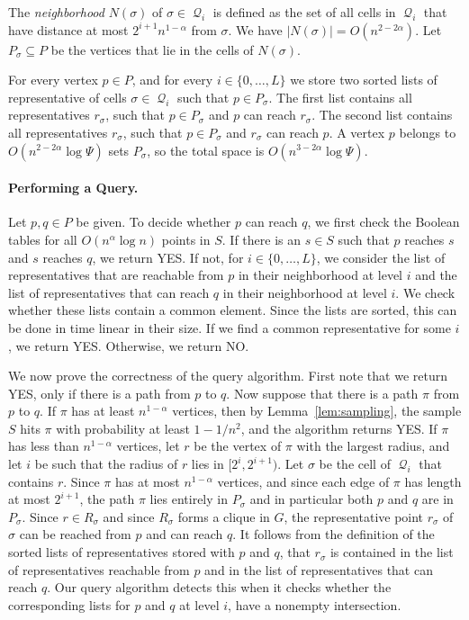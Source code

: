 \documentclass[11pt,a4paper]{paper}
\DeclareMathOperator{\Q}{\mathcal{Q}}
\begin{document}
The \emph{neighborhood} $N(\sigma)$ of $\sigma\in \Q_i$ is defined
as the set of all cells in $\Q_i$ that have distance at most
$2^{i+1}n^{1-\alpha}$ from $\sigma$. We have
$|N(\sigma)| = O(n^{2-2\alpha})$.
Let $P_\sigma \subseteq P$ be the vertices
that lie in the cells of $N(\sigma)$.

For every vertex $p \in P$, and
for every $i \in \{0, \dots, L\}$ we store two sorted lists of representative of cells
$\sigma \in \Q_i$ such that $p \in P_\sigma$. The first list
contains all  representatives $r_\sigma$, such that  $p \in P_\sigma$ and $p$ can reach  $r_\sigma$.
The second list contains all
 representatives $r_\sigma$,  such that  $p \in P_\sigma$ and  $r_\sigma$  can reach $p$.
A vertex $p$ belongs to $O(n^{2-2\alpha}\log \Psi)$
sets $P_\sigma$, so the total space is
$O(n^{3-2\alpha}\log \Psi)$.

\paragraph*{Performing a Query.}
Let $p, q \in P$ be given. To decide whether $p$ can reach $q$,
we first check the Boolean tables for all $O(n^{\alpha}\log n)$ points
in $S$. If there
is an $s\in S$ such that $p$ reaches
$s$ and $s$ reaches $q$, we return YES. If not,
for $i \in \{0, \dots, L\}$,
we consider the list of representatives
that are reachable from $p$ in their neighborhood at level $i$ and
the list of representatives that can reach $q$ in their
neighborhood at level $i$. We check
whether these lists contain a common element. Since the lists are
sorted, this can be done in time linear in their size.
If we find a common representative for some $i$, we return YES.
Otherwise, we return NO.

We now prove the correctness of the query algorithm. First note that we
return YES, only if there is a path from $p$ to
$q$.  Now suppose that there is a path $\pi$ from $p$ to $q$.
If $\pi$ has at least $n^{1-\alpha}$ vertices,
then by Lemma~\ref{lem:sampling}, the sample $S$ hits $\pi$
with probability at least $1-1/n^2$, and the algorithm returns YES.
If $\pi$ has less than $n^{1-\alpha}$ vertices, let $r$ be the
vertex of $\pi$ with the largest radius,
and let $i$ be such that the radius of $r$ lies in $[2^i, 2^{i+1})$.
Let $\sigma$ be the cell of $\Q_i$ that contains $r$.
Since $\pi$ has at most $n^{1-\alpha}$ vertices, and since each edge
of $\pi$ has length at most $2^{i+1}$, the path $\pi$ lies
entirely in  $P_\sigma$ and in particular
 both $p$ and $q$ are in
$P_\sigma$. Since $r \in R_\sigma$ and since
$R_\sigma$ forms a clique in $G$, the representative point
$r_\sigma$ of $\sigma$ can be reached from $p$ and can reach $q$.
It follows from the definition of the sorted lists of representatives stored with $p$ and $q$, that
 $r_\sigma$ is
contained in the list of representatives  reachable  from $p$ and in the
list of representatives that can reach $q$.
Our query algorithm detects this when it checks
whether the corresponding
lists for $p$ and $q$ at level $i$, have a nonempty intersection.
\end{document}
